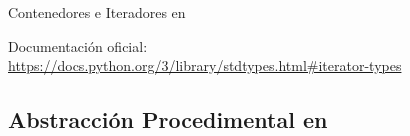 \documentclass[10pt,envcountsect,spanish]{beamer}
\begin{document}
\begin{frame}[fragile]{Contenedores e Iteradores en }
\begin{enumerate}[leftmargin=-.1in, rightmargin=-.3in]
\end{enumerate}

\footnotesize
Documentación oficial: 
\scriptsize
\url{https://docs.python.org/3/library/stdtypes.html#iterator-types} 

\end{frame}







\subsection{Abstracción Procedimental en }
\end{document}

